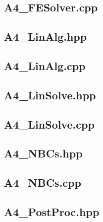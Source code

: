 \documentclass[a4paper, 12pt]{article}
\begin{document}
\subsection{A4\_FESolver.cpp} \label{subsec:FESolver.cpp}


\subsection{A4\_LinAlg.hpp} \label{subsec:LinAlg.hpp}


\subsection{A4\_LinAlg.cpp} \label{subsec:LinAlg.cpp}


\subsection{A4\_LinSolve.hpp} \label{subsec:LinSolve.hpp}


\subsection{A4\_LinSolve.cpp} \label{subsec:LinSolve.cpp}


\subsection{A4\_NBCs.hpp} \label{subsec:NBCs.hpp}


\subsection{A4\_NBCs.cpp} \label{subsec:NBCs.cpp}


\subsection{A4\_PostProc.hpp} \label{subsec:PostProc.hpp}

\end{document}
